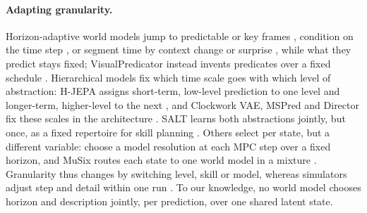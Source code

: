 \paragraph{Adapting granularity.}
Horizon-adaptive world models jump to predictable or key frames \citep{jayaraman2019tap,pertsch2020keyin,kim2019vta}, condition on the time step \citep{nhu2025tawm}, or segment time by context change or surprise \citep{gumbsch2024thick,iiyama2026sunta}, while what they predict stays fixed; VisualPredicator instead invents predicates over a fixed schedule \citep{liang2025visualpredicator}.
Hierarchical models fix which time scale goes with which level of abstraction: H-JEPA assigns short-term, low-level prediction to one level and longer-term, higher-level to the next \citep[\S4.4, \S4.6]{lecun2022path}, and Clockwork VAE, MSPred and Director fix these scales in the architecture \citep{saxena2021clockwork,villarcorrales2022mspred,hafner2022director}. SALT learns both abstractions jointly, but once, as a fixed repertoire for skill planning \citep{huang2026salt}. Others select per state, but a different variable: \citet{wang2023dynamic} choose a model resolution at each MPC step over a fixed horizon, and MuSix routes each state to one world model in a mixture \citep{jang2026musix}. Granularity thus changes by switching level, skill or model, whereas simulators adjust step and detail within one run \citep{mirtich2000timewarp,carlson1997simulation}. To our knowledge, no world model chooses horizon and description jointly, per prediction, over one shared latent state.

